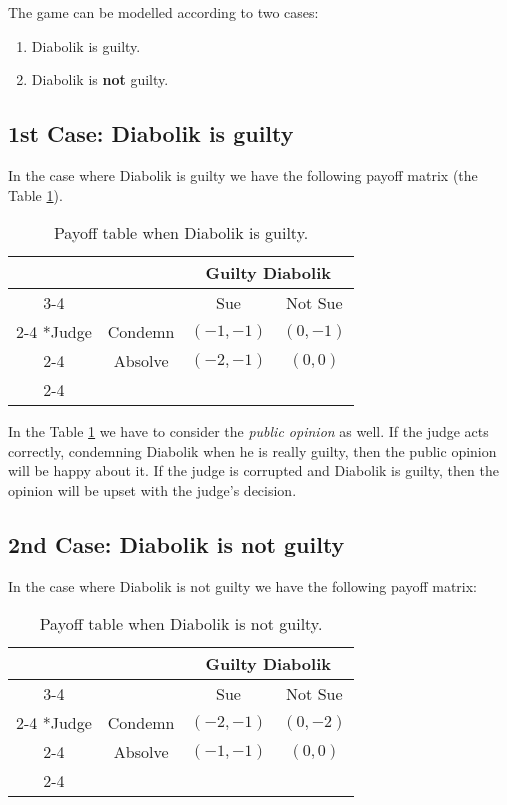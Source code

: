 \documentclass{article}
\begin{document}
\noindent The game can be modelled according to two cases:
\begin{enumerate}
    \item Diabolik is guilty.
    \item Diabolik is \textbf{not} guilty.
\end{enumerate}

\subsection{1st Case: Diabolik is guilty}

In the case where Diabolik is guilty we have the following payoff matrix (the Table \ref{tbl:diabolik1}).
\begin{table}[h!]
    \centering
    \setlength{\extrarowheight}{2pt}
    \label{tbl:diabolik1}
    \begin{tabular}{*{4}{c|}}
      \multicolumn{2}{c}{} & \multicolumn{2}{c}{Guilty Diabolik}\\\cline{3-4}
      \multicolumn{1}{c}{} &  & Sue  & Not Sue \\\cline{2-4}
      \multirow{2}*{Judge}  & Condemn & $(-1, -1)$ & $(0, -1)$ \\\cline{2-4}
      & Absolve & $(-2, -1)$ & $(0,0)$ \\\cline{2-4}
    \end{tabular}
    \caption{Payoff table when Diabolik is guilty.}
\end{table}

\noindent In the Table \ref{tbl:diabolik1} we have to consider the \textit{public opinion} as well. If the judge acts correctly,
condemning Diabolik when he is really guilty, then the public opinion will be happy about it. If the judge is corrupted and Diabolik is guilty, then the 
opinion will be upset with the judge's decision.

\subsection{2nd Case: Diabolik is not guilty}

In the case where Diabolik is not guilty we have the following payoff matrix:
\begin{table}[h!]
    \centering
    \setlength{\extrarowheight}{2pt}
    \label{tbl:diabolik2}
    \begin{tabular}{*{4}{c|}}
      \multicolumn{2}{c}{} & \multicolumn{2}{c}{Guilty Diabolik}\\\cline{3-4}
      \multicolumn{1}{c}{} &  & Sue  & Not Sue \\\cline{2-4}
      \multirow{2}*{Judge}  & Condemn & $(-2, -1)$ & $(0, -2)$ \\\cline{2-4}
      & Absolve & $(-1, -1)$ & $(0,0)$ \\\cline{2-4}
    \end{tabular}
    \caption{Payoff table when Diabolik is not guilty.}
\end{table}
\end{document}
